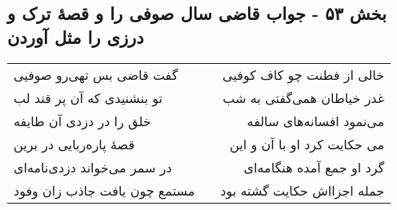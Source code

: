 \begin{center}
\section*{بخش ۵۳ - جواب قاضی سال صوفی را و قصهٔ ترک و درزی را مثل آوردن}
\label{sec:sh053}
\begin{longtable}{l p{0.5cm} r}
گفت قاضی بس تهی‌رو صوفیی
&&
خالی از فطنت چو کاف کوفیی
\\
تو بنشنیدی که آن پر قند لب
&&
غدر خیاطان همی‌گفتی به شب
\\
خلق را در دزدی آن طایفه
&&
می‌نمود افسانه‌های سالفه
\\
قصهٔ پاره‌ربایی در برین
&&
می حکایت کرد او با آن و این
\\
در سمر می‌خواند دزدی‌نامه‌ای
&&
گرد او جمع آمده هنگامه‌ای
\\
مستمع چون یافت جاذب زان وفود
&&
جمله اجزااش حکایت گشته بود
\\
\end{longtable}
\end{center}

